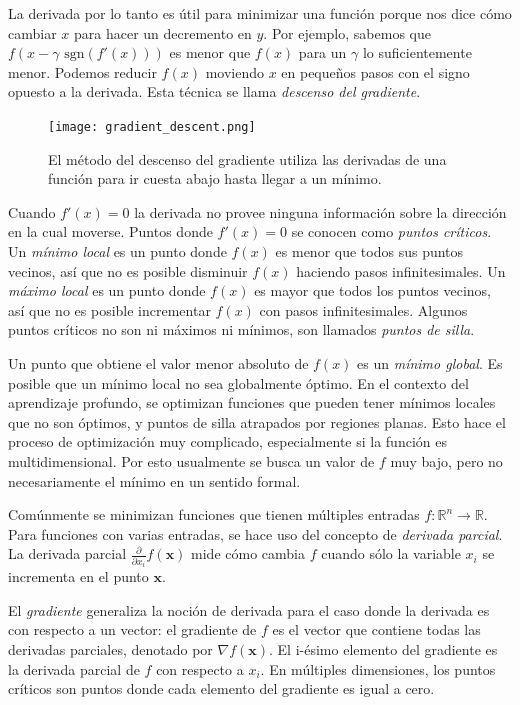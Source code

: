La derivada por lo tanto es útil para minimizar una función porque nos dice
cómo cambiar $x$ para hacer un decremento en $y$. Por ejemplo, sabemos que
$f(x - \gamma  \text{ sgn} (f'(x)))$ es menor que $f(x)$ para un $\gamma$ lo
suficientemente menor. Podemos reducir $f(x)$ moviendo $x$ en pequeños pasos
con el signo opuesto a la derivada. Esta técnica se llama \textit{descenso del gradiente}.

\begin{figure}[ht]
    \centering
    \texttt{[image: gradient\_descent.png]}
    \caption{El método del descenso del gradiente utiliza las derivadas de una función para ir cuesta abajo hasta llegar a un mínimo.}
    \label{fig:gradient_descent_first_example}
\end{figure}

Cuando $f'(x) = 0$ la derivada no provee ninguna información sobre la dirección
en la cual moverse. Puntos donde $f'(x) = 0$ se conocen como 
\textit{puntos críticos}. Un \textit{mínimo local} es un punto donde $f(x)$ es
menor que todos sus puntos vecinos, así que no es posible 
disminuir $f(x)$ haciendo pasos infinitesimales. Un \textit{máximo local} es
un punto donde $f(x)$ es mayor que todos los puntos vecinos, así que no es posible
incrementar $f(x)$ con pasos infinitesimales. Algunos puntos críticos no son
ni máximos ni mínimos, son llamados \textit{puntos de silla}.

Un punto que obtiene el valor menor absoluto de $f(x)$ es un \textit{mínimo global}.
Es posible que un mínimo local no sea globalmente óptimo. En el contexto
del aprendizaje profundo, se optimizan funciones que 
pueden tener mínimos locales que no son óptimos, y puntos de silla 
atrapados por regiones planas. Esto hace el proceso de optimización
muy complicado, especialmente si la función es multidimensional.
Por esto usualmente se busca un valor de $f$ muy bajo, pero
no necesariamente el mínimo en un sentido formal.

Comúnmente se minimizan funciones que tienen múltiples entradas 
$f: \mathbb{R}^n \rightarrow \mathbb{R}$. Para funciones con varias entradas,
se hace uso del concepto de \textit{derivada parcial}. La derivada
parcial $\frac{\partial}{\partial x_i} f(\mathbf{x})$ mide cómo
cambia $f$ cuando sólo la variable $x_i$ se incrementa en el punto $\mathbf{x}$.\\

\begin{remark}
El \textit{gradiente} generaliza la noción de derivada para el caso
donde la derivada es con respecto a un vector: el gradiente de $f$ es el
vector que contiene todas las derivadas parciales, denotado por $\nabla f(\mathbf{x})$. El i-ésimo elemento del gradiente es la 
derivada parcial de $f$ con respecto a $x_i$. En múltiples dimensiones,
los puntos críticos son puntos donde cada elemento del gradiente es igual 
a cero.
\end{remark}

